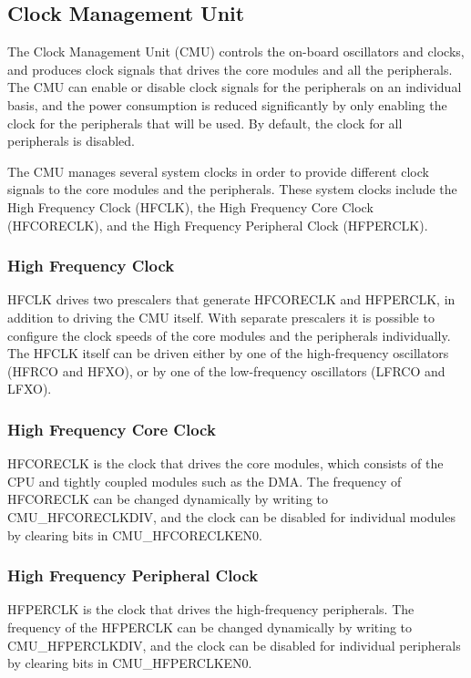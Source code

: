 \subsection{Clock Management Unit}\label{sec:cmu}
The Clock Management Unit (CMU) controls the on-board oscillators and clocks, and produces clock signals that drives the core modules and all the peripherals. The CMU can enable or disable clock signals for the peripherals on an individual basis, and the power consumption is reduced significantly by only enabling the clock for the peripherals that will be used. By default, the clock for all peripherals is disabled. 

The CMU manages several system clocks in order to provide different clock signals to the core modules and the peripherals. These system clocks include the High Frequency Clock (HFCLK), the High Frequency Core Clock (HFCORECLK), and the High Frequency Peripheral Clock (HFPERCLK).\cite{efm32gg-rm}

\subsubsection{High Frequency Clock}
HFCLK drives two prescalers that generate HFCORECLK and HFPERCLK, in addition to driving the CMU itself. With separate prescalers it is possible to configure the clock speeds of the core modules and the peripherals individually. The HFCLK itself can be driven either by one of the high-frequency oscillators (HFRCO and HFXO), or by one of the low-frequency oscillators (LFRCO and LFXO). 

\subsubsection{High Frequency Core Clock}
HFCORECLK is the clock that drives the core modules, which consists of the CPU and tightly coupled modules such as the DMA. The frequency of HFCORECLK can be changed dynamically by writing to CMU\_HFCORECLKDIV, and the clock can be disabled for individual modules by clearing bits in CMU\_HFCORECLKEN0. 

\subsubsection{High Frequency Peripheral Clock}
HFPERCLK is the clock that drives the high-frequency peripherals. The frequency of the HFPERCLK can be changed dynamically by writing to CMU\_HFPERCLKDIV, and the clock can be disabled for individual peripherals by clearing bits in CMU\_HFPERCLKEN0. 

